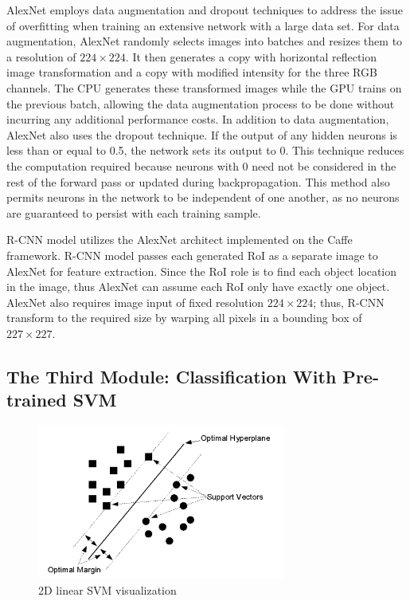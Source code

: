 AlexNet employs data augmentation and dropout techniques to address the issue of overfitting when training an extensive network with a large data set. For data augmentation, AlexNet randomly selects images into batches and resizes them to a resolution of $224 \times 224$. It then generates a copy with horizontal reflection image transformation and a copy with modified intensity for the three RGB channels. The CPU generates these transformed images while the GPU trains on the previous batch, allowing the data augmentation process to be done without incurring any additional performance costs. In addition to data augmentation, AlexNet also uses the dropout technique. If the output of any hidden neurons is less than or equal to 0.5, the network sets its output to 0. This technique reduces the computation required because neurons with 0 need not be considered in the rest of the forward pass or updated during backpropagation. This method also permits neurons in the network to be independent of one another, as no neurons are guaranteed to persist with each training sample.

R-CNN model utilizes the AlexNet architect implemented on the Caffe framework. R-CNN model passes each generated RoI as a separate image to AlexNet for feature extraction. Since the RoI role is to find each object location in the image, thus AlexNet can assume each RoI only have exactly one object. AlexNet also requires image input of fixed resolution $224 \times 224$; thus, R-CNN transform to the required size by warping all pixels in a bounding box of $227 \times 227$.

\subsection{The Third Module: Classification With Pre-trained SVM}

\begin{figure}[!ht]
    \centering
    \includegraphics[height=2in]{figures/2d_svm.png}
    \caption{2D linear SVM visualization \cite{2d_svm_Tzotsos}} \label{fig:2d_svm_viz}
\end{figure}

